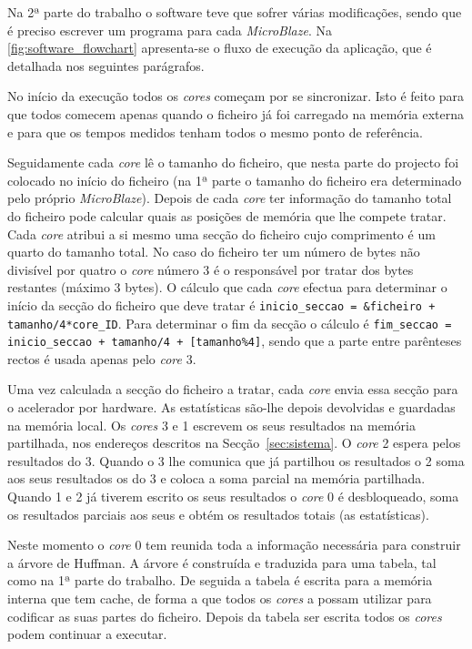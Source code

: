 
Na 2ª parte do trabalho o software teve que sofrer várias modificações, sendo que é preciso escrever um programa para cada \textit{MicroBlaze}. Na \autoref{fig:software_flowchart} apresenta-se o fluxo de execução da aplicação, que é detalhada nos seguintes parágrafos.

No início da execução todos os \textit{cores} começam por se sincronizar. Isto é feito para que todos comecem apenas quando o ficheiro já foi carregado na memória externa e para que os tempos medidos tenham todos o mesmo ponto de referência.

Seguidamente cada \textit{core} lê o tamanho do ficheiro, que nesta parte do projecto foi colocado no início do ficheiro (na 1ª parte o tamanho do ficheiro era determinado pelo próprio \textit{MicroBlaze}). Depois de cada \textit{core} ter informação do tamanho total do ficheiro pode calcular quais as posições de memória que lhe compete tratar. Cada \textit{core} atribui a si mesmo uma secção do ficheiro cujo comprimento é um quarto do tamanho total. No caso do ficheiro ter um número de bytes não divisível por quatro o \textit{core} número 3 é o responsável por tratar dos bytes restantes (máximo 3 bytes). O cálculo que cada \textit{core} efectua para determinar o início da secção do ficheiro que deve tratar é \texttt{inicio\_seccao = \&ficheiro + tamanho/4*core\_ID}. Para determinar o fim da secção o cálculo é \texttt{fim\_seccao = inicio\_seccao + tamanho/4 + [tamanho\%4]}, sendo que a parte entre parênteses rectos é usada apenas pelo \textit{core} 3.

Uma vez calculada a secção do ficheiro a tratar, cada \textit{core} envia essa secção para o acelerador por hardware. As estatísticas são-lhe depois devolvidas e guardadas na memória local. Os \textit{cores} 3 e 1 escrevem os seus resultados na memória partilhada, nos endereços descritos na Secção~\ref{sec:sistema}. O \textit{core} 2 espera pelos resultados do 3. Quando o 3 lhe comunica que já partilhou os resultados o 2 soma aos seus resultados os do 3 e coloca a soma parcial na memória partilhada. Quando 1 e 2 já tiverem escrito os seus resultados o \textit{core} 0 é desbloqueado, soma os resultados parciais aos seus e obtém os resultados totais (as estatísticas).

Neste momento o \textit{core} 0 tem reunida toda a informação necessária para construir a árvore de Huffman. A árvore é construída e traduzida para uma tabela, tal como na 1ª parte do trabalho. De seguida a tabela é escrita para a memória interna que tem cache, de forma a que todos os \textit{cores} a possam utilizar para codificar as suas partes do ficheiro. Depois da tabela ser escrita todos os \textit{cores} podem continuar a executar.

